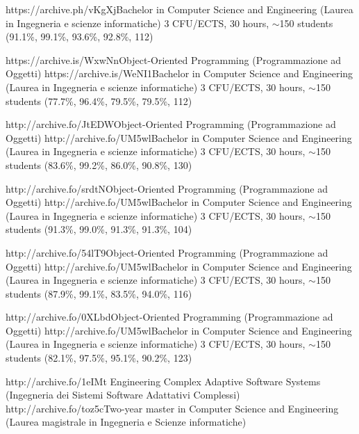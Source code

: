 \begin{outerlist}
        {https://archive.ph/vKgXj}{Bachelor in Computer Science and Engineering (Laurea in Ingegneria e scienze informatiche)}
        {3 CFU/ECTS, 30 hours, $\sim${}150 students}
        {(91.1\%, 99.1\%, 93.6\%, 92.8\%, 112)}
        {\oopjava}
    \item[2020/21]
        \unibocourse
        {https://archive.is/WxwNn}{Object-Oriented Programming (Programmazione ad Oggetti)}
        {https://archive.is/WeNI1}{Bachelor in Computer Science and Engineering (Laurea in Ingegneria e scienze informatiche)}
        {3 CFU/ECTS, 30 hours, $\sim$150 students}
        {(77.7\%, 96.4\%, 79.5\%, 79.5\%, 112)}
        {\oopjava}
    \item[2019/20]
        \unibocourse
        {http://archive.fo/JtEDW}{Object-Oriented Programming (Programmazione ad Oggetti)}
        {http://archive.fo/UM5wl}{Bachelor in Computer Science and Engineering (Laurea in Ingegneria e scienze informatiche)}
        {3 CFU/ECTS, 30 hours, $\sim$150 students}
        {(83.6\%, 99.2\%, 86.0\%, 90.8\%, 130)}
        {\oopjava}
    \item[2018/19]
        \unibocourse
        {http://archive.fo/srdtN}{Object-Oriented Programming (Programmazione ad Oggetti)}
        {http://archive.fo/UM5wl}{Bachelor in Computer Science and Engineering (Laurea in Ingegneria e scienze informatiche)}
        {3 CFU/ECTS, 30 hours, $\sim$150 students}
        {(91.3\%, 99.0\%, 91.3\%, 91.3\%, 104)}
        {\oopjava}
    \item[2017/18]
        \unibocourse
        {http://archive.fo/54lT9}{Object-Oriented Programming (Programmazione ad Oggetti)}
        {http://archive.fo/UM5wl}{Bachelor in Computer Science and Engineering (Laurea in Ingegneria e scienze informatiche)}
        {3 CFU/ECTS, 30 hours, $\sim$150 students}
        {(87.9\%, 99.1\%, 83.5\%, 94.0\%, 116)}
        {\oopjava}
    \item[2016/17]
        \unibocourse
        {http://archive.fo/0XLbd}{Object-Oriented Programming (Programmazione ad Oggetti)}
        {http://archive.fo/UM5wl}{Bachelor in Computer Science and Engineering (Laurea in Ingegneria e scienze informatiche)}
        {3 CFU/ECTS, 30 hours, $\sim$150 students}
        {(82.1\%, 97.5\%, 95.1\%, 90.2\%, 123)}
        {\oopjava}
    \item[2015/16]
        \unibocourse
        {http://archive.fo/1eIMt}{
            Engineering Complex Adaptive Software Systems
            (Ingegneria dei Sistemi Software Adattativi Complessi)
        }
        {http://archive.fo/toz5c}{Two-year master in Computer Science and Engineering (Laurea magistrale in Ingegneria e Scienze informatiche)}

\end{outerlist}
